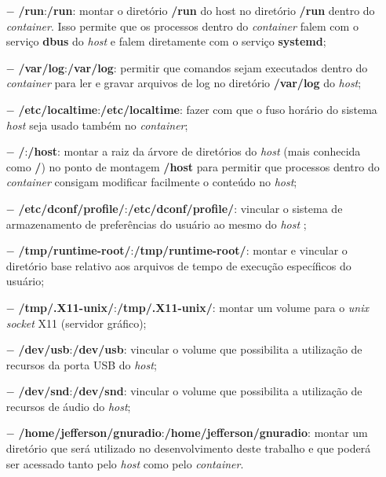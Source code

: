 \documentclass[
  12pt,				%
  openright,			%
  twoside,			%
  a4paper,			%
  english,			%
  french,				%
  spanish,			%
  brazil,				%
  ]{abntex2}
\begin{document}
\begin{itemize}
  \item[$-$] \textbf{/run}:\textbf{/run}: montar o diretório \textbf{/run} do host no diretório \textbf{/run} dentro do \textit{container}. Isso permite que os processos dentro do
        \textit{container} falem com o serviço \textbf{dbus} do \textit{host} e falem diretamente com o serviço \textbf{systemd};

  \item[$-$] \textbf{/var/log}:\textbf{/var/log}: permitir que comandos sejam executados dentro do \textit{container} para ler e gravar arquivos de log no diretório
        \textbf{/var/log} do \textit{host};

  \item[$-$] \textbf{/etc/localtime}:\textbf{/etc/localtime}: fazer com que o fuso horário do sistema \textit{host} seja usado
        também no \textit{container};

  \item[$-$] \textbf{/}:\textbf{/host}: montar a raiz da árvore de diretórios do \textit{host} (mais conhecida como \textbf{/}) no  ponto
        de montagem \textbf{/host} para permitir que processos dentro do \textit{container} consigam modificar facilmente o conteúdo no \textit{host};

  \item[$-$] \textbf{/etc/dconf/profile/}:\textbf{/etc/dconf/profile/}: vincular o sistema de armazenamento de preferências do usuário ao mesmo do \textit{host} \cite{RHEL-dconf-profile:2020};

  \item[$-$] \textbf{/tmp/runtime-root/}:\textbf{/tmp/runtime-root/}: montar e vincular o diretório base relativo aos arquivos de
        tempo de execução específicos do usuário;

  \item[$-$] \textbf{/tmp/.X11-unix/}:\textbf{/tmp/.X11-unix/}: montar um volume para o \textit{unix socket} X11 (servidor gráfico);

  \item[$-$] \textbf{/dev/usb}:\textbf{/dev/usb}: vincular o volume que possibilita a utilização de recursos da porta USB do \textit{host};

  \item[$-$] \textbf{/dev/snd}:\textbf{/dev/snd}: vincular o volume que possibilita a utilização de recursos de áudio do \textit{host};

  \item[$-$] \textbf{/home/jefferson/gnuradio}:\textbf{/home/jefferson/gnuradio}: montar um diretório que será utilizado no desenvolvimento
        deste trabalho e que poderá ser acessado tanto pelo \textit{host} como pelo \textit{container}.
\end{itemize}
\end{document}
